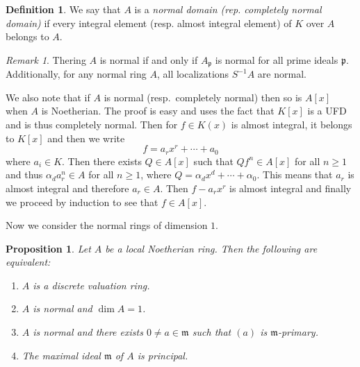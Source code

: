 \documentclass[leqno, openany]{memoir}
\newtheorem{prop}[thm]{Proposition}
\theoremstyle{definition}
\newtheorem{defn}[thm]{Definition}
\theoremstyle{remark}
\newtheorem{rmk}[thm]{Remark}
\theoremstyle{plain}
\theoremstyle{definition}
\theoremstyle{remark}
\newcommand{\mf}[1]{\mathfrak{#1}}
\begin{document}
\begin{defn}
    We say that $A$ is a \textit{normal domain (rep. completely normal domain)} if every integral element (resp. almost integral element) of $K$ over $A$ belongs to $A$. 
\end{defn}

\begin{rmk}
    Thering $A$ is normal if and only if $A_{\mf{p}}$ is normal for all prime ideals $\mf{p}$. Additionally, for any normal ring $A$, all localizations $S^{-1}A$ are normal.
\end{rmk}

We also note that if $A$ is normal (resp.~completely normal) then so is $A[x]$ when $A$ is Noetherian. The proof is easy and uses the fact that $K[x]$ is a UFD and is thus completely normal. Then for $f \in K(x)$ is almost integral, it belongs to $K[x]$ and then we write
\[ f = a_r x^r + \cdots + a_0 \]
where $a_i \in K$. Then there exists $Q \in A[x]$ such that $Q f^n \in A[x]$ for all $n \geq 1$ and thus $\alpha_d a_r^n \in A$ for all $n \geq 1$, where $Q = \alpha_d x^d + \cdots + \alpha_0$. This means that $a_r$ is almost integral and therefore $a_r \in A$. Then $f - a_r x^r$ is almost integral and finally we proceed by induction to see that $f \in A[x]$.

Now we consider the normal rings of dimension $1$.
\begin{prop}
    Let $A$ be a local Noetherian ring. Then the following are equivalent:
    \begin{enumerate}
        \item $A$ is a discrete valuation ring.
        \item $A$ is normal and $\dim A = 1$.
        \item $A$ is normal and there exists $0 \neq a \in \mf{m}$ such that $(a)$ is $\mf{m}$-primary.
        \item The maximal ideal $\mf{m}$ of $A$ is principal.
    \end{enumerate}
\end{prop}
\end{document}
